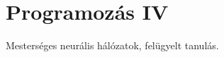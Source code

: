 \documentclass[../../main.tex]{subfiles}
\begin{document}
\section{Programozás IV}

\begin{fulltheorem}
	Mesterséges neurális hálózatok, felügyelt tanulás.
\end{fulltheorem}
\end{document}
